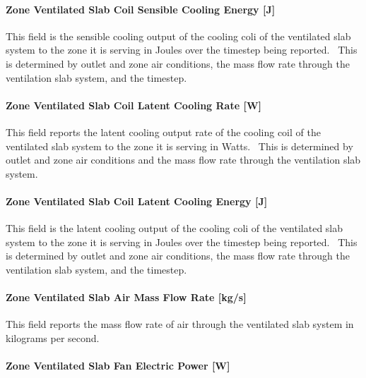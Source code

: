 \paragraph{Zone Ventilated Slab Coil Sensible Cooling Energy {[}J{]}}\label{zone-ventilated-slab-coil-sensible-cooling-energy-j}

This field is the sensible cooling output of the cooling coli of the ventilated slab system to the zone it is serving in Joules over the timestep being reported.~ This is determined by outlet and zone air conditions, the mass flow rate through the ventilation slab system, and the timestep.

\paragraph{Zone Ventilated Slab Coil Latent Cooling Rate {[}W{]}}\label{zone-ventilated-slab-coil-latent-cooling-rate-w}

This field reports the latent cooling output rate of the cooling coil of the ventilated slab system to the zone it is serving in Watts.~ This is determined by outlet and zone air conditions and the mass flow rate through the ventilation slab system.

\paragraph{Zone Ventilated Slab Coil Latent Cooling Energy {[}J{]}}\label{zone-ventilated-slab-coil-latent-cooling-energy-j}

This field is the latent cooling output of the cooling coli of the ventilated slab system to the zone it is serving in Joules over the timestep being reported.~ This is determined by outlet and zone air conditions, the mass flow rate through the ventilation slab system, and the timestep.

\paragraph{Zone Ventilated Slab Air Mass Flow Rate {[}kg/s{]}}\label{zone-ventilated-slab-air-mass-flow-rate-kgs}

This field reports the mass flow rate of air through the ventilated slab system in kilograms per second.

\paragraph{Zone Ventilated Slab Fan Electric Power {[}W{]}}\label{zone-ventilated-slab-fan-electric-power-w}

